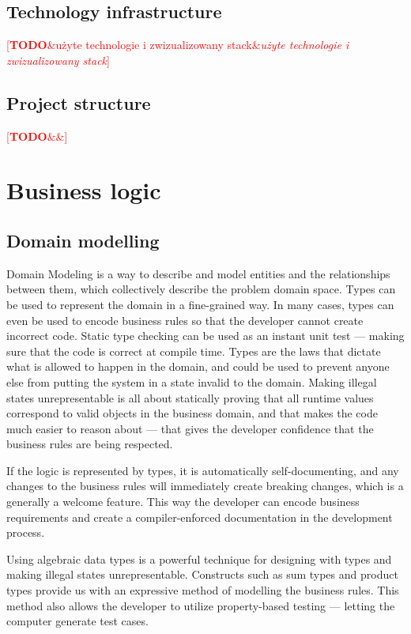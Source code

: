\documentclass[english,engineering]{wizthesis}
\newcommand{\todo}[1]{%
  \textcolor{red}{[\textbf{TODO}\ifx&#1&{}\else{ }\fi\emph{#1}]}%
}
\newcommand{\paraphrase}[1]{#1}
\begin{document}
\subsection{Technology infrastructure}

\todo{użyte technologie i zwizualizowany stack}

\subsection{Project structure}

\todo{}

\section{Business logic}

\subsection{Domain modelling} \label{sbs:domain-modelling}

\paraphrase{Domain Modeling is a way to describe and model entities and the
relationships between them, which collectively describe the problem domain
space. Types can be used to represent the domain in a fine-grained way. In many
cases, types can even be used to encode business rules so that the developer
cannot create incorrect code. Static type checking can be used as an instant
unit test --- making sure that the code is correct at compile time. Types are
the laws that dictate what is allowed to happen in the domain, and could be used
to prevent anyone else from putting the system in a state invalid to the domain.
Making illegal states unrepresentable is all about statically proving that all
runtime values correspond to valid objects in the business domain, and that
makes the code much easier to reason about --- that gives the developer
confidence that the business rules are being respected.}

\paraphrase{If the logic is represented by types, it is automatically
self-documenting, and any changes to the business rules will immediately create
breaking changes, which is a generally a welcome feature. This way the developer
can encode business requirements and create a compiler-enforced documentation in
the development process.}

Using algebraic data types is a powerful technique for designing with types and
making illegal states unrepresentable. Constructs such as sum types and product
types provide us with an expressive method of modelling the business rules.
This method also allows the developer to utilize property-based testing ---
letting the computer generate test cases.
\end{document}
